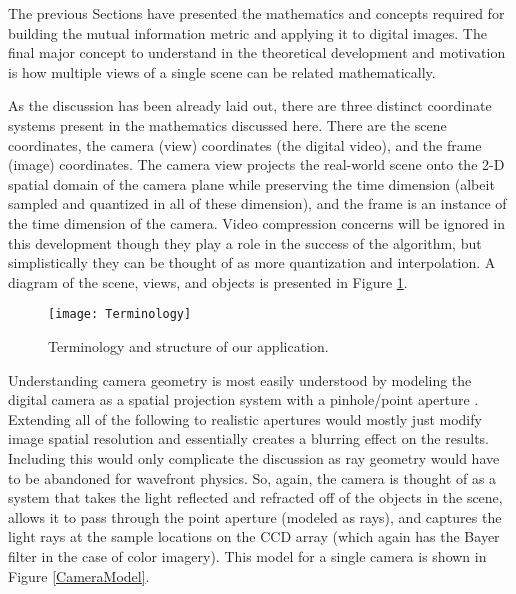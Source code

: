 %
%
%
%
%
%
%
%
%

%
%
%



The previous Sections have presented the mathematics and concepts required for building the mutual information metric and applying it to digital images. The final major concept to understand in the theoretical development and motivation is how multiple views of a single scene can be related mathematically.

As the discussion has been already laid out, there are three distinct coordinate systems present in the mathematics discussed here. There are the scene coordinates, the camera (view) coordinates (the digital video), and the frame (image) coordinates. The camera view projects the real-world scene onto the 2-D spatial domain of the camera plane while preserving the time dimension (albeit sampled and quantized in all of these dimension), and the frame is an instance of the time dimension of the camera. Video compression concerns will be ignored in this development though they play a role in the success of the algorithm, but simplistically they can be thought of as  more quantization and interpolation. A diagram of the scene, views, and objects is presented in Figure \ref{sceneTerminology}.

\begin{figure}[h]
\centering
\texttt{[image: Terminology]}
\caption{Terminology and structure of our application.}
\label{sceneTerminology}
\end{figure}

Understanding camera geometry is most easily understood by modeling the digital camera as a spatial projection system with a pinhole/point aperture \cite{Hartley2003}. Extending all of the following to realistic apertures would mostly just modify image spatial resolution and essentially creates a blurring effect on the results. Including this would only complicate the discussion as ray geometry would have to be abandoned for wavefront physics. So, again, the camera is thought of as a system that takes the light reflected and refracted off of the objects in the scene, allows it to pass through the point aperture (modeled as rays), and captures the light rays at the sample locations on the CCD array (which again has the Bayer filter in the case of color imagery). This model for a single camera is shown in Figure \ref{CameraModel}.

